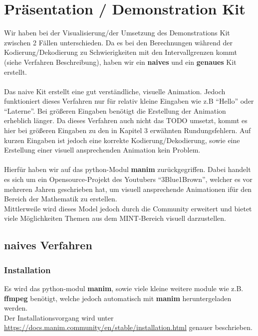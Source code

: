 \documentclass[a4paper]{article}
\theoremstyle{definition}
\theoremstyle{remark}
\begin{document}
			\section{Präsentation / Demonstration Kit}
Wir haben bei der Visualisierung/der Umsetzung des Demonstrations Kit zwischen 2 Fällen unterschieden. Da es bei den Berechnungen während der Kodierung/Dekodierung zu Schwierigkeiten mit den Intervallgrenzen kommt (siehe Verfahren Beschreibung), haben wir ein \textbf{naives} und ein \textbf{genaues} Kit erstellt.
\\
\\
Das naive Kit erstellt eine gut verständliche, visuelle Animation. Jedoch funktioniert dieses Verfahren nur für relativ kleine Eingaben wie z.B ``Hello'' oder ``Laterne''. Bei größeren Eingaben benötigt die Erstellung der Animation erheblich länger. Da dieses Verfahren auch nicht das TODO umsetzt, kommt es hier bei größeren Eingaben zu den in Kapitel 3 erwähnten Rundungsfehlern. Auf kurzen Eingaben ist jedoch eine korrekte
Kodierung/Dekodierung, sowie eine Erstellung einer visuell ansprechenden Animation kein Problem. 
\\
\\
Hierfür haben wir auf das python-Modul \textbf{manim} zurückgegriffen. Dabei handelt es sich um ein Opensource-Projekt des Youtubers ``3Blue1Brown'', welcher es vor mehreren Jahren geschrieben hat, um visuell ansprechende Animationen ifür den Bereich der Mathematik zu erstellen.
\\
Mittlerweile wird dieses Model jedoch durch die Community erweitert und bietet viele Möglichkeiten Themen aus dem MINT-Bereich visuell darzustellen.
\subsection{naives Verfahren}
\label{sec:manim}
\subsubsection{Installation}
Es wird das python-modul \textbf{manim}, sowie viele kleine weitere module wie z.B. \textbf{ffmpeg} benötigt, welche jedoch automatisch mit \textbf{manim} heruntergeladen werden.\\
Der Installationsvorgang wird unter \href{https://docs.manim.community/en/stable/installation.html}{https://docs.manim.community/en/stable/installation.html}
genauer beschrieben.
\\
\end{document}
